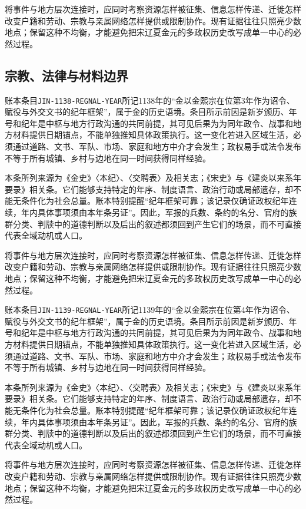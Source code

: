 将事件与地方层次连接时，应同时考察资源怎样被征集、信息怎样传递、迁徙怎样改变户籍和劳动、宗教与亲属网络怎样提供或限制协作。现有证据往往只照亮少数地点；保留这种不均衡，才能避免把宋辽夏金元的多政权历史改写成单一中心的必然过程。

\subsection{宗教、法律与材料边界}

账本条目\texttt{JIN-1138-REGNAL-YEAR}所记1138年的“金以金熙宗在位第3年作为诏令、赋役与外交文书的纪年框架”，属于金的历史语境。条目所示前因是新岁颁历、年号和纪年是中枢与地方行政沟通的共同前提，其可见后果为为同年政令、战事和地方材料提供日期锚点，不能单独推知具体政策执行。这一变化若进入区域生活，必须通过道路、文书、军队、市场、家庭和地方中介才会发生；政权易手或法令发布不等于所有城镇、乡村与边地在同一时间获得同样经验。

本条所列来源为《金史》〈本纪〉、〈交聘表〉及相关志；《宋史》与《建炎以来系年要录》相关条。它们能够支持特定的年序、制度语言、政治行动或局部遗存，却不能无条件化为社会总量。账本特别提醒“纪年框架可靠；该记录仅确证政权纪年连续，年内具体事项须由本年条另证”。因此，军报的兵数、条约的名分、官府的族群分类、判牍中的道德判断以及后出的叙述都须回到产生它们的场景，而不可直接代表全域动机或人口。

将事件与地方层次连接时，应同时考察资源怎样被征集、信息怎样传递、迁徙怎样改变户籍和劳动、宗教与亲属网络怎样提供或限制协作。现有证据往往只照亮少数地点；保留这种不均衡，才能避免把宋辽夏金元的多政权历史改写成单一中心的必然过程。

账本条目\texttt{JIN-1139-REGNAL-YEAR}所记1139年的“金以金熙宗在位第4年作为诏令、赋役与外交文书的纪年框架”，属于金的历史语境。条目所示前因是新岁颁历、年号和纪年是中枢与地方行政沟通的共同前提，其可见后果为为同年政令、战事和地方材料提供日期锚点，不能单独推知具体政策执行。这一变化若进入区域生活，必须通过道路、文书、军队、市场、家庭和地方中介才会发生；政权易手或法令发布不等于所有城镇、乡村与边地在同一时间获得同样经验。

本条所列来源为《金史》〈本纪〉、〈交聘表〉及相关志；《宋史》与《建炎以来系年要录》相关条。它们能够支持特定的年序、制度语言、政治行动或局部遗存，却不能无条件化为社会总量。账本特别提醒“纪年框架可靠；该记录仅确证政权纪年连续，年内具体事项须由本年条另证”。因此，军报的兵数、条约的名分、官府的族群分类、判牍中的道德判断以及后出的叙述都须回到产生它们的场景，而不可直接代表全域动机或人口。

将事件与地方层次连接时，应同时考察资源怎样被征集、信息怎样传递、迁徙怎样改变户籍和劳动、宗教与亲属网络怎样提供或限制协作。现有证据往往只照亮少数地点；保留这种不均衡，才能避免把宋辽夏金元的多政权历史改写成单一中心的必然过程。

